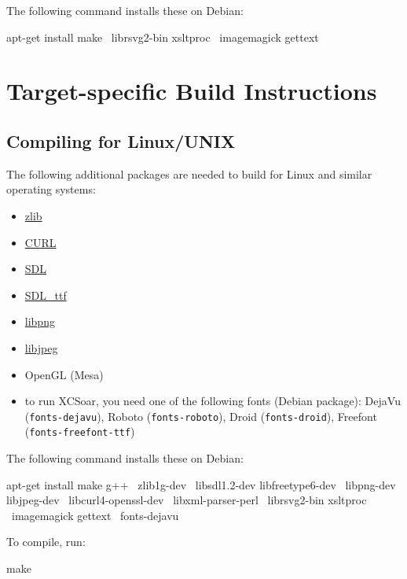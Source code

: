 The following command installs these on Debian:

\begin{verbatim*}
apt-get install make \
  librsvg2-bin xsltproc \
  imagemagick gettext
\end{verbatim*}

\section{Target-specific Build Instructions}

\subsection{Compiling for Linux/UNIX}

The following additional packages are needed to build for Linux and
similar operating systems:

\begin{itemize}
\item \href{http://www.zlib.net/}{zlib}
\item \href{http://curl.haxx.se/}{CURL}
\item \href{http://www.libsdl.org/}{SDL}
\item \href{http://www.libsdl.org/projects/SDL\_ttf/}{SDL\_ttf}
\item \href{http://www.libpng.org/}{libpng}
\item \href{http://libjpeg.sourceforge.net/}{libjpeg}
\item OpenGL (Mesa)
\item to run XCSoar, you need one of the following fonts (Debian
  package): DejaVu (\texttt{fonts-dejavu}),
  Roboto (\texttt{fonts-roboto}),
  Droid (\texttt{fonts-droid}),
  Freefont (\texttt{fonts-freefont-ttf})
\end{itemize}

The following command installs these on Debian:

\begin{verbatim*}
apt-get install make g++ \
  zlib1g-dev \
  libsdl1.2-dev libfreetype6-dev \
  libpng-dev libjpeg-dev \
  libcurl4-openssl-dev \
  libxml-parser-perl \
  librsvg2-bin xsltproc \
  imagemagick gettext \
  fonts-dejavu
\end{verbatim*}

To compile, run:

\begin{verbatim*}
make
\end{verbatim*}

